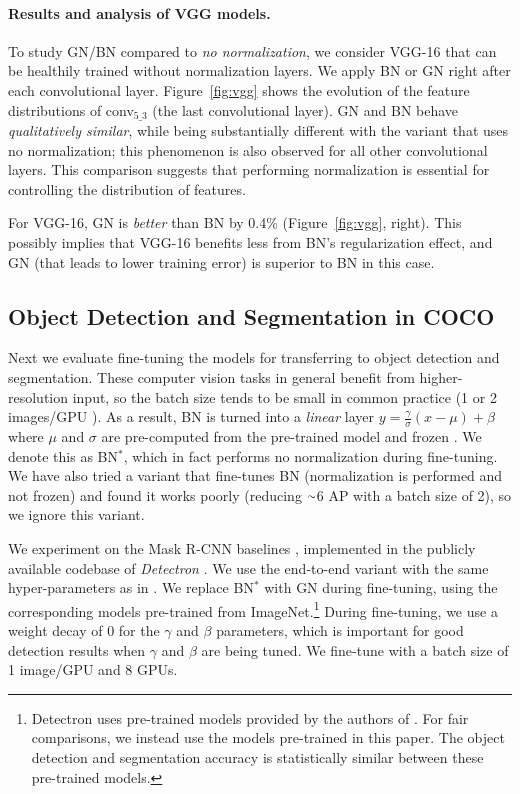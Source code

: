 \documentclass[10pt,twocolumn,letterpaper]{article}
\newcommand{\app}{\raise.17ex\hbox{$\scriptstyle\sim$}}
\newcommand{\f}{$^\text{*}$\xspace}
\begin{document}
\paragraph{Results and analysis of VGG models.} To study GN/BN compared to \emph{no normalization}, we consider VGG-16 \cite{Simonyan2015} that can be healthily trained without normalization layers. We apply BN or GN right after each convolutional layer.
Figure~\ref{fig:vgg} shows the evolution of the feature distributions of conv$_{5\_3}$ (the last convolutional layer). GN and BN behave \emph{qualitatively similar}, while being substantially different with the variant that uses no normalization; this phenomenon is also observed for all other convolutional layers. This comparison suggests that performing normalization is essential for controlling the distribution of features.

For VGG-16, GN is \emph{better} than BN by 0.4\% (Figure~\ref{fig:vgg}, right). This possibly implies that VGG-16 benefits less from BN's regularization effect, and GN (that leads to lower training error) is superior to BN in this case.

\subsection{Object Detection and Segmentation in COCO}

Next we evaluate fine-tuning the models for transferring to object detection and segmentation. These computer vision tasks in general benefit from higher-resolution input, so the batch size tends to be small in common practice (1 or 2 images/GPU \cite{Girshick2015,Ren2015,He2017,Lin2017a}). As a result, BN is turned into a \emph{linear} layer $y=\frac{\gamma}{\sigma}(x-\mu)+\beta$ where $\mu$ and $\sigma$ are pre-computed from the pre-trained model and frozen \cite{He2016}. We denote this as BN\f, which in fact performs no normalization during fine-tuning. We have also tried a variant that fine-tunes BN (normalization is performed and not frozen) and found it works poorly (reducing $\app$6 AP with a batch size of 2), so we ignore this variant.

We experiment on the Mask R-CNN baselines \cite{He2017}, implemented in the publicly available codebase of \emph{Detectron} \cite{Detectron2018}. We use the end-to-end variant with the same hyper-parameters as in \cite{Detectron2018}. 
We replace BN\f with GN during fine-tuning, using the corresponding models pre-trained from ImageNet.\footnote{Detectron \cite{Detectron2018} uses pre-trained models provided by the authors of \cite{He2016}. For fair comparisons, we instead use the models pre-trained in this paper. The object detection and segmentation accuracy is statistically similar between these pre-trained models.}
During fine-tuning, we use a weight decay of 0 for the $\gamma$ and $\beta$ parameters, which is important for good detection results when $\gamma$ and $\beta$ are being tuned. We fine-tune with a batch size of 1 image/GPU and 8 GPUs.
\end{document}
